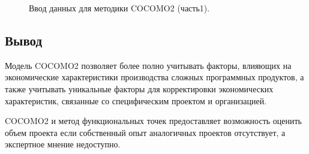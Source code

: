 \documentclass[a4paper,14pt]{article}
\begin{document}
\newpage
\begin{figure}[!h]
         \caption{Ввод данных для методики COCOMO2 (часть1).}
    \label{fig:input1}
\end{figure}

\subsection*{Вывод}

Модель COCOMO2 позволяет более полно учитывать факторы, влияющих на экономические характеристики производства сложных программных продуктов, а также учитывать уникальные факторы для корректировки экономических характеристик, связанные со специфическим проектом и организацией.

COCOMO2 и метод функциональных точек предоставляет возможность оценить объем проекта если собственный опыт аналогичных проектов отсутствует, а экспертное мнение недоступно.
\end{document}

